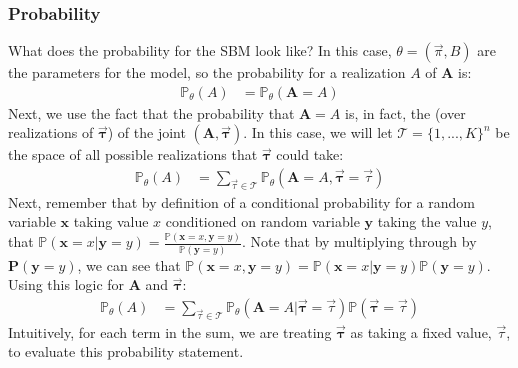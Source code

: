 \documentclass[letterpaper,10pt,english]{jupyterBook}
\begin{document}
\subsubsection{Probability}
\label{\detokenize{representations/ch5/single-network-models_theory:id2}}
\sphinxAtStartPar
What does the probability for the  SBM look like? In this case, \(\theta = (\vec \pi, B)\) are the parameters for the model, so the probability for a realization \(A\) of \(\mathbf A\) is:
\begin{align*}
\mathbb P_\theta(A) &= \mathbb P_\theta(\mathbf A = A)
\end{align*}
\sphinxAtStartPar
Next, we use the fact that the probability that \(\mathbf A = A\) is, in fact, the  (over realizations of \(\vec{\pmb \tau}\)) of the joint \((\mathbf A, \vec{\pmb \tau})\). In this case, we will let \(\mathcal T = \{1,...,K\}^n\) be the space of all possible realizations that \(\vec{\pmb \tau}\) could take:
\label{equation:representations/ch5/single-network-models_theory:9c16a564-ea42-456d-a5ee-f3a10fedbeb1}\begin{align}
\mathbb P_\theta(A)&= \sum_{\vec \tau \in \mathcal T} \mathbb P_\theta(\mathbf A = A, \vec{\pmb \tau} = \vec \tau) 
\end{align}
\sphinxAtStartPar
Next, remember that by definition of a conditional probability for a random variable \(\mathbf x\) taking value \(x\) conditioned on random variable \(\mathbf y\) taking the value \(y\), that \(\mathbb P(\mathbf x = x | \mathbf y = y) = \frac{\mathbb P(\mathbf x = x, \mathbf y = y)}{\mathbb P(\mathbf y = y)}\). Note that by multiplying through by \(\mathbf P(\mathbf y = y)\), we can see that \(\mathbb P(\mathbf x = x, \mathbf y = y) = \mathbb P(\mathbf x = x| \mathbf y = y)\mathbb P(\mathbf y = y)\). Using this logic for \(\mathbf A\) and \(\vec{\pmb \tau}\):
\begin{align*}
\mathbb P_\theta(A) &=\sum_{\vec \tau \in \mathcal T} \mathbb P_\theta(\mathbf A = A| \vec{\pmb \tau} = \vec \tau)\mathbb P(\vec{\pmb \tau} = \vec \tau)
\end{align*}
\sphinxAtStartPar
Intuitively, for each term in the sum, we are treating \(\vec{\pmb \tau}\) as taking a fixed value, \(\vec\tau\), to evaluate this probability statement.
\end{document}
